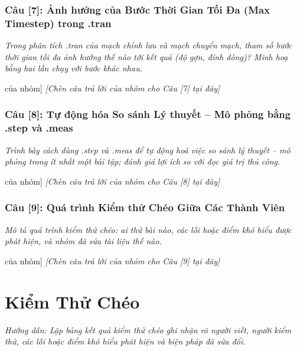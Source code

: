 \documentclass[12pt,a4paper]{report}
\begin{document}
\subsection*{Câu [7]: Ảnh hưởng của Bước Thời Gian Tối Đa (Max Timestep) trong .tran}
\textit{\color{guidegray}Trong phân tích .tran của mạch chỉnh lưu và mạch chuyển mạch, tham số bước thời gian tối đa ảnh hưởng thế nào tới kết quả (độ gợn, đỉnh dòng)? Minh hoạ bằng hai lần chạy với bước khác nhau.}
\begin{orangebox}[Trả lời Câu [7] của nhóm]
\textit{\color{guidegray}[Chèn câu trả lời của nhóm cho Câu [7] tại đây]}
\end{orangebox}

\subsection*{Câu [8]: Tự động hóa So sánh Lý thuyết -- Mô phỏng bằng .step và .meas}
\textit{\color{guidegray}Trình bày cách dùng .step và .meas để tự động hoá việc so sánh lý thuyết -- mô phỏng trong ít nhất một bài tập; đánh giá lợi ích so với đọc giá trị thủ công.}
\begin{orangebox}[Trả lời Câu [8] của nhóm]
\textit{\color{guidegray}[Chèn câu trả lời của nhóm cho Câu [8] tại đây]}
\end{orangebox}

\subsection*{Câu [9]: Quá trình Kiểm thử Chéo Giữa Các Thành Viên}
\textit{\color{guidegray}Mô tả quá trình kiểm thử chéo: ai thử bài nào, các lỗi hoặc điểm khó hiểu được phát hiện, và nhóm đã sửa tài liệu thế nào.}
\begin{orangebox}[Trả lời Câu [9] của nhóm]
\textit{\color{guidegray}[Chèn câu trả lời của nhóm cho Câu [9] tại đây]}
\end{orangebox}

\chapter{Kiểm Thử Chéo}

\textit{\color{guidegray}
Hướng dẫn: Lập bảng kết quả kiểm thử chéo ghi nhận rõ người viết, người kiểm thử, các lỗi hoặc điểm khó hiểu phát hiện và biện pháp đã sửa đổi.
}
\end{document}
